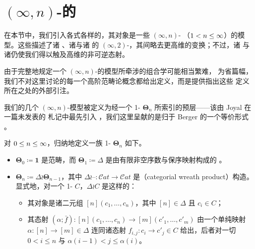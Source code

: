 
\providecommand{\Fun}{\operatorname{Fun}}
\providecommand{\Cat}{\mathcal{C}at}
\providecommand{\sSet}{s\mathcal{S}et}
\providecommand{\Set}{\mathcal{S}et}
\providecommand{\QCat}{\mathcal{Q}\mathcal{C}at}
\providecommand{\ssSet}{ss\mathcal{S}et}%
\providecommand{\CSS}{\mathcal{C}\mathcal{S}\mathcal{S}}
\providecommand{\OneComp}{1\text{-}\mathcal{C}omp}
\providecommand{\qcOne}{\mathbf{1}}   %
\providecommand{\qcInt}{\mathbb{I}}   %
\providecommand{\rvWarrow}{\rightsquigarrow}%

\section{\texorpdfstring{$(\infty,n)$}{(∞,n)}-\trCategory{}的%
\trInfinityCosmos}\label{sec:infinity-cosmoi-of-infinity-n-categories}

在本节中，我们引入各式各样的\trInfinityCosmos，其对象是一些 $(\infty,n)$-%
\trCategory（$1<n\le\infty$）的模型。这些\trInfinityCosmos{}描述了诸%
\trInfinityCategory、诸\trInfinityFunctor{}与诸\trInfinityNaturalTransformation{}%
的 $(\infty,2)$-\trCategory，其间略去更高维的变换；不过，诸\trGeneralizedElement{}%
与诸\trInternalHom{}仍使我们得以触及高维的非可逆态射。

由于完整地规定一个 $(\infty,n)$-\trCategory{}的模型所牵涉的组合学可能相当繁难，
为省篇幅，我们不对这里讨论的每一个高阶范畴论概念都给出定义，而是提供指出这些
定义所在之处的外部引注。

我们的几个 $(\infty,n)$-\trCategory{}模型被定义为经一个 1-\trCategory{}
$\boldsymbol{\Theta}_{n}$ 所索引的预层——该\trCategory{}由 Joyal 在一篇未发表的
札记中最先引入 \cite{bib60}，我们这里呈献的是归于 Berger 的一个等价形式
\cite{bib11}。

\begin{definition}\label{def:theta-categories}
对 $0\le n\le\infty$，归纳地定义一族 1-\trCategory{} $\boldsymbol{\Theta}_{n}$ 如下。
\begin{itemize}
\item $\boldsymbol{\Theta}_{0}\coloneqq\qcOne$ 是\trTerminal{}范畴，而
  $\boldsymbol{\Theta}_{1}\coloneqq\Delta$ 是由有限非空序数与保序映射构成的%
  \trCategory。
\item $\boldsymbol{\Theta}_{n}\coloneqq\Delta\wr\boldsymbol{\Theta}_{n-1}$，其中
  $\Delta\wr\text{--}\colon\Cat\to\Cat$ 是\textbf{\trWreathProduct}（categorial
  wreath product）构造。显式地，对一个 1-\trCategory{} $C$，$\Delta\wr C$
  是这样的\trCategory：
  \begin{itemize}
  \item 其对象是诸二元组 $[n](c_{1},\dots,c_{n})$，其中 $[n]\in\Delta$ 且
    $c_{i}\in C$；
  \item 其态射 $(\alpha;\bar{f})\colon[n](c_{1},\dots,c_{n})\to[m](c'_{1},\dots,c'_{m})$ 由一个单纯映射
    $\alpha\colon[n]\to[m]\in\Delta$
    连同诸态射 $f_{i,j}\colon c_{i}\to c'_{j}\in C$ 给出，后者对一切
    $0<i\le n$ 与 $\alpha(i-1)<j\le\alpha(i)$。
  \end{itemize}
\end{itemize}
\end{definition}

